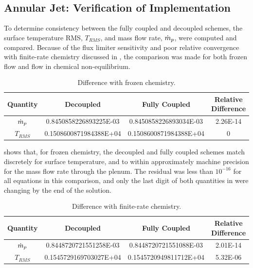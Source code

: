 \subsection{Annular Jet: Verification of Implementation}
\label{sec:annular-jet-flow-verify}

To determine consistency between the fully coupled and decoupled schemes, the
surface temperature RMS, $T_{RMS}$, and mass flow rate, $\dot{m}_p$, were
computed and compared.  Because of the flux limiter sensitivity and poor
relative convergence with finite-rate chemistry discussed in
, the comparison was made for both frozen flow and
flow in chemical non-equilibrium.
\begin{table}
  \centering
  \caption{Difference with frozen chemistry.}
  \begin{tabular}{c|c|c|c}
    Quantity & Decoupled & Fully Coupled & Relative Difference \\
    \hline
    $\dot{m}_p$ & 0.8450858226893225E-03 & 0.8450858226893034E-03 & 2.26E-14 \\
    $T_{RMS}$   & 0.1508600871984388E+04 & 0.1508600871984388E+04 & 0
  \end{tabular}
  \label{tab:srp-frozen-flow-diff}
\end{table}
 shows that, for frozen chemistry, the decoupled
and fully coupled schemes match discretely for surface temperature, and to
within approximately machine precision for the mass flow rate through the
plenum.  The residual was less than $10^{-16}$ for all equations in this
comparison, and only the last digit of both quantities in
 were changing by the end of the solution.
\begin{table}
  \centering
  \caption{Difference with finite-rate chemistry.}
  \begin{tabular}{c|c|c|c}
    Quantity & Decoupled & Fully Coupled & Relative Difference \\
    \hline
    $\dot{m}_p$ & 0.8448720721551258E-03 & 0.8448720721551088E-03 & 2.01E-14 \\
    $T_{RMS}$   & 0.1545729169703027E+04 & 0.1545720949811712E+04 & 5.32E-06
  \end{tabular}
  \label{tab:srp-chem-flow-diff}
\end{table}

